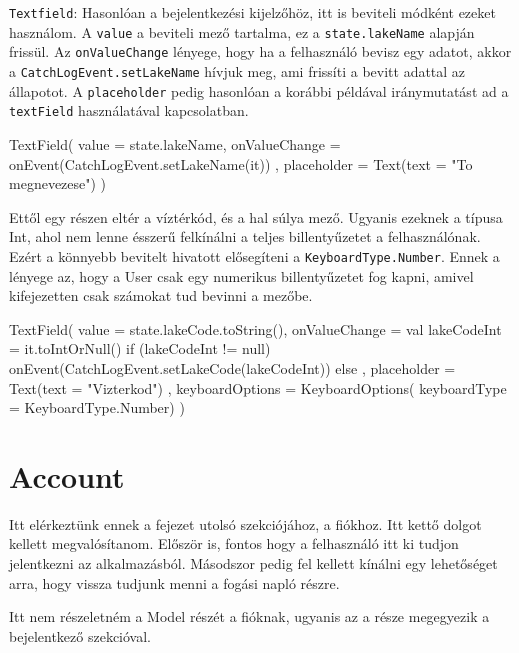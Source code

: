 \texttt{Textfield}: Hasonlóan a bejelentkezési kijelzőhöz, itt is beviteli módként ezeket használom.
A \texttt{value} a beviteli mező tartalma, ez a \texttt{state.lakeName} alapján frissül.
Az \texttt{onValueChange} lényege, hogy ha a felhasználó bevisz egy adatot, akkor a \texttt{CatchLogEvent.setLakeName} hívjuk meg, ami frissíti a bevitt adattal az állapotot.
A \texttt{placeholder} pedig hasonlóan a korábbi példával iránymutatást ad a \texttt{textField} használatával kapcsolatban.

\begin{java}[caption = {A lakeName beviteli mező.}]
 TextField(
            value = state.lakeName,
            onValueChange = {
                onEvent(CatchLogEvent.setLakeName(it))
            },
            placeholder = {
                Text(text = "To megnevezese")
            }
        )    
\end{java}

Ettől egy részen eltér a víztérkód, és a hal súlya mező. Ugyanis ezeknek a típusa Int, ahol nem lenne ésszerű felkínálni a teljes billentyűzetet a felhasználónak. Ezért a könnyebb bevitelt hivatott elősegíteni a \texttt{KeyboardType.Number}. Ennek a lényege az, hogy a User csak egy numerikus billentyűzetet fog kapni, amivel kifejezetten csak számokat tud bevinni a mezőbe.

\newpage

\begin{java}[caption = {A víztérkód programrészlet szemléltetése.}]
TextField(
    value = state.lakeCode.toString(),
    onValueChange = {
        val lakeCodeInt = it.toIntOrNull()
        if (lakeCodeInt != null) {
            onEvent(CatchLogEvent.setLakeCode(lakeCodeInt))
        } else { }
    },
    placeholder = {
        Text(text = "Vizterkod")
    },
    keyboardOptions = KeyboardOptions(
        keyboardType = KeyboardType.Number)
)    
\end{java}

\section{Account}
Itt elérkeztünk ennek a fejezet utolsó szekciójához, a fiókhoz. Itt kettő dolgot kellett megvalósítanom. Először is, fontos hogy a felhasználó itt ki tudjon jelentkezni az alkalmazásból. 
Másodszor pedig fel kellett kínálni egy lehetőséget arra, hogy vissza tudjunk menni a fogási napló részre.

Itt nem részeletném a Model részét a fióknak, ugyanis az a része megegyezik a bejelentkező szekcióval.

